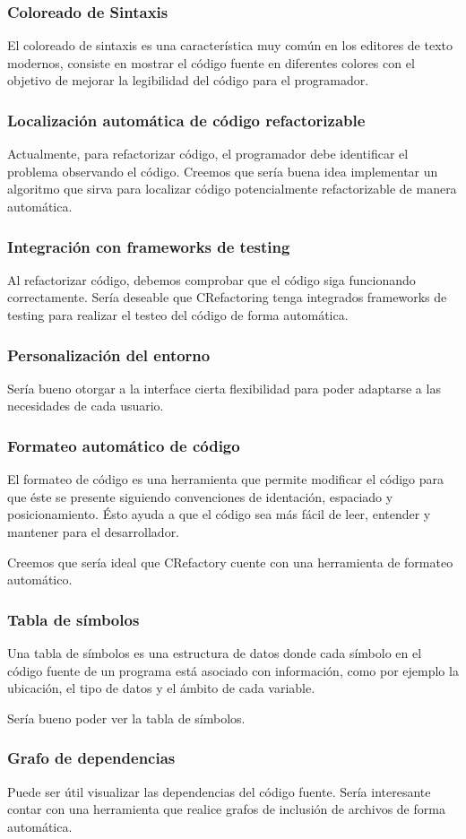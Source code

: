 \documentclass[a4paper,oneside,12pt]{article}
\begin{document}
\subsubsection{Coloreado de Sintaxis}
El coloreado de sintaxis es una caracter\'istica muy com\'un en los editores de texto modernos, consiste en mostrar el c\'odigo fuente en diferentes colores con el objetivo de mejorar la legibilidad del c\'odigo para el programador.

\subsubsection{Localizaci\'on autom\'atica de c\'odigo refactorizable}
Actualmente, para refactorizar c\'odigo, el programador debe identificar el problema observando el c\'odigo. Creemos que ser\'ia buena idea implementar un algoritmo que sirva para localizar c\'odigo potencialmente refactorizable de manera autom\'atica.

\subsubsection{Integraci\'on con frameworks de testing}
Al refactorizar c\'odigo, debemos comprobar que el c\'odigo siga funcionando correctamente. Ser\'ia deseable que CRefactoring tenga integrados frameworks de testing para realizar el testeo del c\'odigo de forma autom\'atica.

\subsubsection{Personalizaci\'on del entorno}
Ser\'ia bueno otorgar a la interface cierta flexibilidad para poder adaptarse a las necesidades de cada usuario.


\subsubsection{Formateo autom\'atico de c\'odigo}
El formateo de c\'odigo es una herramienta que permite modificar el c\'odigo para que \'este se presente siguiendo convenciones de identaci\'on, espaciado y posicionamiento. \'Esto ayuda a que el c\'odigo sea m\'as f\'acil de leer, entender y mantener para el desarrollador.

Creemos que ser\'ia ideal que CRefactory cuente con una herramienta de formateo autom\'atico.


\subsubsection{Tabla de s\'imbolos}
Una tabla de s\'imbolos es una estructura de datos donde cada s\'imbolo en el c\'odigo fuente de un programa est\'a asociado con informaci\'on, como por ejemplo la ubicaci\'on, el tipo de datos y el \'ambito de cada variable.

Ser\'ia bueno poder ver la tabla de s\'imbolos.

\subsubsection{Grafo de dependencias}
Puede ser \'util visualizar las dependencias del c\'odigo fuente. Ser\'ia interesante contar con una herramienta que realice grafos de inclusi\'on de archivos de forma autom\'atica.
\end{document}
